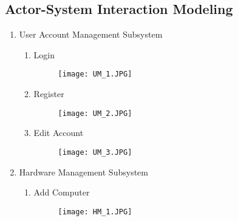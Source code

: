 \documentclass{article}
\begin{document}
	\subsection{Actor-System Interaction Modeling}
    	\begin{enumerate}
         \item{User Account Management Subsystem}
        		\begin{enumerate}
                    \item{Login}
                    \begin{figure}[!ht]
                    	\centering
                        \texttt{[image: UM\_1.JPG]}	
                        \newline
                        \newline
                    \end{figure}
                    
                    \item{Register}
                    \begin{figure}[H]
                    	\centering
                        \texttt{[image: UM\_2.JPG]}
                        \newline
                        \newline
                    \end{figure}
                    
                    
                    \item{Edit Account}
                    \begin{figure}[H]
                    	\centering
                        \texttt{[image: UM\_3.JPG]}
                        \newline
                        \newline
                    \end{figure}
                 \end{enumerate}
                 
            \item{Hardware Management Subsystem}
        		\begin{enumerate}
                    \item{Add Computer}
                    \begin{figure}[H]
                    	\centering
                        \texttt{[image: HM\_1.JPG]}	
                        \newline
                        \newline
                    \end{figure}
                    

\end{enumerate}
\end{enumerate}
\end{document}
